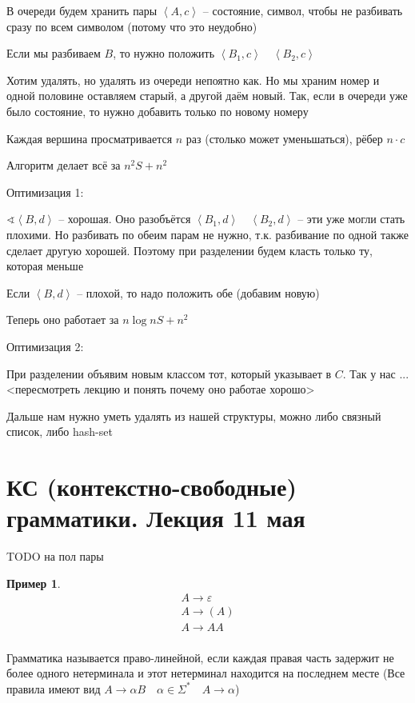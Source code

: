 \documentclass{book}
\theoremstyle{definition}
\newtheorem*{example}{Пример}
\begin{document}
В очереди будем хранить пары $\left<A,c \right>$ -- состояние, символ, чтобы не разбивать сразу по всем символом (потому что это неудобно)

Если мы разбиваем $B$, то нужно положить  $\left<B_1, c \right>\quad \left<B_2,c \right>$

Хотим удалять, но удалять из очереди непоятно как. Но мы храним номер и одной половине оставляем старый, а другой даём новый. Так, если в очереди уже было состояние, то нужно добавить только по новому номеру

Каждая вершина просматривается $n$ раз (столько может уменьшаться), рёбер  $n\cdot c$

Алгоритм делает всё за $n^2S + n^2$

Оптимизация 1:

 $\sphericalangle \left<B, d \right>$ -- хорошая. Оно разобъётся $\left<B_1,d \right>\quad \left<B_2,d \right>$ -- эти уже могли стать плохими. Но разбивать по обеим парам не нужно, т.к. разбивание по одной также сделает другую хорошей. Поэтому при разделении будем класть только ту, которая меньше

 Если $\left<B,d \right>$ -- плохой, то надо положить обе (добавим новую)

 Теперь оно работает за $n\log n S + n^2$

 Оптимизация 2:

 При разделении объявим новым классом тот, который указывает в $C$. Так у нас ... <пересмотреть лекцию и понять почему оно работае хорошо>

 Дальше нам нужно уметь удалять из нашей структуры, можно либо связный список, либо hash-set


 \section{КС (контекстно-свободные) грамматики. Лекция 11 мая}
 TODO на пол пары

\begin{example}
    \begin{gather*}
        A \to \varepsilon\\
        A \to (A)\\
        A \to A A\\
    \end{gather*}
\end{example}

\begin{definition}
    Грамматика называется право-линейной, если каждая правая часть задержит не более одного нетерминала и этот нетерминал находится на последнем месте (Все правила имеют вид $A \to \alpha B\quad \alpha\in\Sigma^*\quad A \to \alpha$)
\end{definition}
\end{document}
